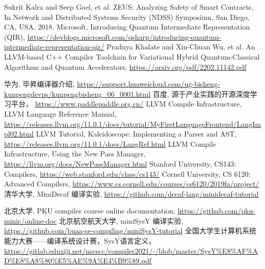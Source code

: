 \documentclass{SCIS2020cn}
\begin{document}
\begin{thebibliography}{99}
     Sukrit Kalra and Seep Goel, et al. ZEUS: Analyzing Safety of Smart Contracts, In Network and Distributed Systems Security (NDSS) Symposium, San Diego, CA, USA, 2018.
     Microsoft, Introducing Quantum Intermediate Representation (QIR), \url{https://devblogs.microsoft.com/qsharp/introducing-quantum-intermediate-representation-qir/}
     Pradnya Khalate and Xin-Chuan Wu, et al. An LLVM-based C++ Compiler Toolchain for Variational Hybrid Quantum-Classical Algorithms and Quantum Accelerators, \url{https://arxiv.org/pdf/2202.11142.pdf}

    华为, 毕昇编译器介绍, \url{https://support.huaweicloud.com/ug-bisheng-kunpengdevps/kunpengbisheng\_06\_0001.html}
    百度, 源于产业实践的开源深度学习平台， \url{https://www.paddlepaddle.org.cn/}
     LLVM Compile Infrastructure, LLVM Language Reference Manual,
    \url{https://releases.llvm.org/11.0.1/docs/tutorial/MyFirstLanguageFrontend/LangImpl02.html}
     LLVM Tutorial, Kaleidoscope: Implementing a Parser and AST, \url{https://releases.llvm.org/11.0.1/docs/LangRef.html}
     LLVM Compile Infrastructure, Using the New Pass Manager, \url{https://llvm.org/docs/NewPassManager.html}
     Stanford University, CS143: Compilers, \url{https://web.stanford.edu/class/cs143/}
     Cornell University, CS 6120: Advanced Compilers, \url{https://www.cs.cornell.edu/courses/cs6120/2019fa/project/}
     清华大学, MiniDecaf 编译实验, \url{https://github.com/decaf-lang/minidecaf-tutorial}

     北京大学, PKU compiler course online documentation, \url{https://github.com/pku-minic/online-doc}
     北京航空航天大学, miniSysY 编译实验, \url{https://github.com/buaa-se-compiling/miniSysY-tutorial}
    全国大学生计算机系统能力大赛——编译系统设计赛，SysY语言定义，\url{https://gitlab.eduxiji.net/nscscc/compiler2021/-/blob/master/SysY\%E8\%AF\%AD\%E8\%A8\%80\%E5\%AE\%9A\%E4\%B9\%89.pdf}

\end{thebibliography}

\end{document}
